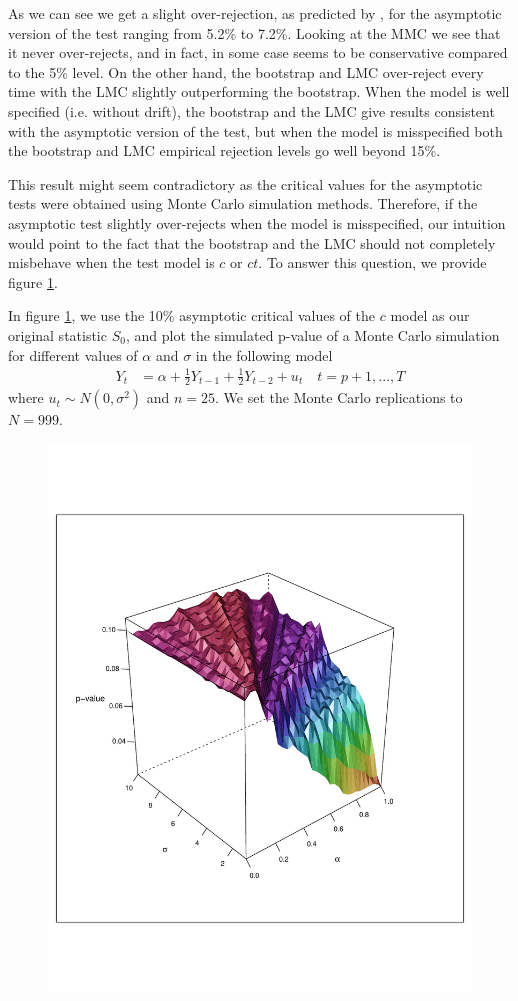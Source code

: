 \documentclass[]{article}\usepackage[]{graphicx}\usepackage[]{color}
\begin{document}
As we can see we get a slight over-rejection, as predicted by \cite{david_a._dickey_determining_1987},  for the asymptotic version of the test ranging from 5.2\% to 7.2\%. Looking at the MMC we see that it never over-rejects, and in fact, in some case seems to be conservative compared to the 5\% level. On the other hand, the bootstrap and LMC over-reject every time with the LMC slightly outperforming the bootstrap. When the model is well specified (i.e. without drift), the bootstrap and the LMC give results consistent with the asymptotic version of the test, but when the model is misspecified both the bootstrap and LMC empirical rejection levels go well beyond 15\%.

This result might seem contradictory as the critical values for the asymptotic tests were obtained using Monte Carlo simulation methods. Therefore, if the asymptotic test slightly over-rejects when the model is misspecified, our intuition would point to the fact that the bootstrap and the LMC should not completely misbehave when the test model is $c$ or $ct$. To answer this question, we provide figure \ref{fig:c-drift}.

In figure \ref{fig:c-drift}, we use the 10\% asymptotic critical values of the $c$ model as our original statistic $S_0$, and plot the simulated p-value of a Monte Carlo simulation for different values of $\alpha$ and $\sigma$ in the following model
\begin{align}
	Y_t & = \alpha + \frac{1}{2}Y_{t-1} + \frac{1}{2}Y_{t-2} + u_t \quad t = p + 1, ... , T
\end{align}
where $u_t \sim N(0,\sigma^2)$ and $n=25$. We set the Monte Carlo replications to $N=999$.

\begin{figure}[H]
	\centering
	\includegraphics[width=0.7\linewidth]{fig/c-drift}
	\caption{}
	\label{fig:c-drift}
\end{figure}
\end{document}

